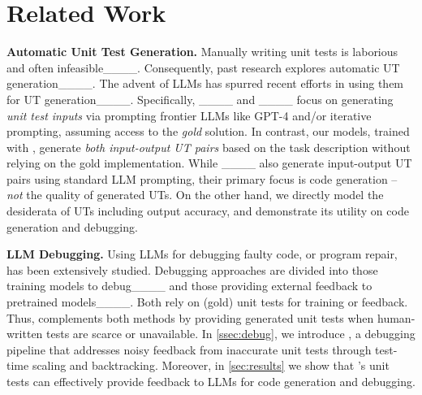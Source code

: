 \section{Related Work}
\noindent\textbf{Automatic Unit Test Generation. \hspace{0.5em}} Manually writing unit tests is laborious and often infeasible____. Consequently, past research explores automatic UT generation____. The advent of LLMs has spurred recent efforts in using them for UT generation____. Specifically, ____ and ____ focus on generating \emph{unit test inputs} via prompting frontier LLMs like GPT-4 and/or iterative prompting, assuming access to the \emph{gold} solution. 
In contrast, our models, trained with \method{}, generate \emph{both input-output UT pairs} based on the task description without relying on the gold implementation. 
While ____ also generate input-output UT pairs using standard LLM prompting, their primary focus is code generation -- \emph{not} the quality of generated UTs. On the other hand, we directly model the desiderata of UTs including output accuracy, and demonstrate its utility on code generation and debugging.

\vspace{0.35em}
\noindent\textbf{LLM Debugging. \hspace{0.5em}} Using LLMs for debugging faulty code, or program repair, has been extensively studied. Debugging approaches are divided into those training models to debug____ and those providing external feedback to pretrained models____. Both rely on (gold) unit tests for training or feedback. Thus, \method{} complements both methods by providing generated unit tests when human-written tests are scarce or unavailable.  In \cref{ssec:debug}, we introduce \debugmethod{}, a debugging pipeline that addresses noisy feedback from inaccurate unit tests through test-time scaling and backtracking. Moreover, in \cref{sec:results} we show that \method{}'s unit tests can effectively provide feedback to LLMs for code generation and debugging.